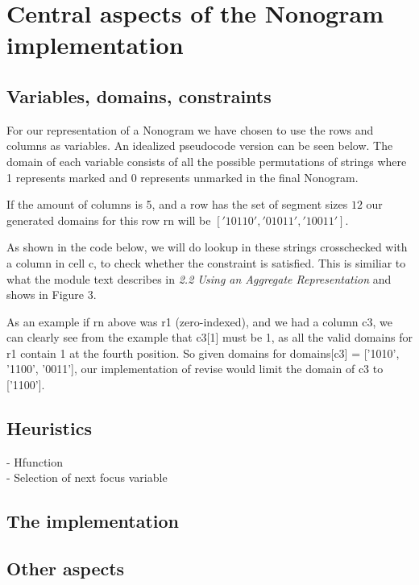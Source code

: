 
\section{Central aspects of the Nonogram implementation}
\subsection{Variables, domains, constraints}
For our representation of a Nonogram we have chosen to
use the rows and columns as variables. An idealized pseudocode
version can be seen below. The domain of each variable consists
of all the possible permutations of strings where 1 represents
marked and 0 represents unmarked in the final Nonogram.

If the amount of columns is 5, and a row has the set of segment
sizes \({1 2}\) our generated domains for this row rn will be
$ ['10110', '01011', '10011'] $.

As shown in the code below, we will do lookup in these strings
crosschecked with a column in cell c, to check whether the constraint
is satisfied. This is similiar to what the module text describes in
\emph{2.2 Using an Aggregate Representation} and shows in Figure 3.

As an example if rn above was r1 (zero-indexed), and we had a column
c3, we can clearly see from the example that c3[1] must be 1, as all the
valid domains for r1 contain 1 at the fourth position. So given domains
for domains[c3] = ['1010', '1100', '0011'], our implementation of revise
would limit the domain of c3 to ['1100'].



\subsection{Heuristics}
- H\-function\\
- Selection of next focus variable

\subsection{The implementation}

\subsection{Other aspects}
